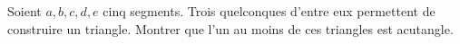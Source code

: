 Soient $a, b, c, d, e$ cinq segments. Trois quelconques d'entre eux permettent de construire un triangle. Montrer que l'un au moins de ces triangles est acutangle.

